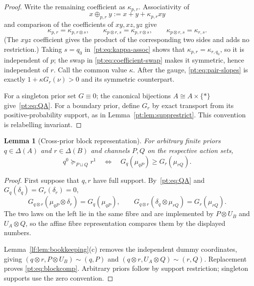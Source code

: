\documentclass[11pt,a4paper]{article}
\newtheorem{lemma}[theorem]{Lemma}
\theoremstyle{definition}
\newcommand{\1}{\mathbf 1}
\begin{document}
\begin{proof}
Write the remaining coefficient as $\kappa_{p,r}$.  Associativity of
\[
 x\oplus_{p,r}y:=x+y+\kappa_{p,r}xy
\]
and comparison of the coefficients of $xy,xz,yz$ give
\[
 \kappa_{p,r}=\kappa_{p,r\otimes s},\qquad
 \kappa_{p\otimes r,s}=\kappa_{p,r\otimes s},\qquad
 \kappa_{p\otimes r,s}=\kappa_{r,s}.
\tag{KA}\label{pt:eq:kappa-assoc}
\]
(The $xyz$ coefficient gives the product of the corresponding two sides and
adds no restriction.)  Taking $s=q_0$ in~\eqref{pt:eq:kappa-assoc} shows that
$\kappa_{p,r}=\kappa_{r,q_0}$, so it is independent of $p$; the swap in
\eqref{pt:eq:coefficient-swap} makes it symmetric, hence independent of $r$.
Call the common value $\kappa$.  After the gauge,
\eqref{pt:eq:pair-slopes} is exactly
$1+\kappa G_r(\nu)>0$ and its symmetric counterpart.

For a singleton prior set $G\equiv0$; the canonical bijections
$A\cong A\times\{*\}$ give~\eqref{pt:eq:QA}.  For a boundary prior, define
$G_r$ by exact transport from its positive-probability support, as in
Lemma~\ref{pt:lem:supprestrict}.  This convention is relabelling invariant.
\end{proof}

\begin{lemma}[Cross-prior block representation]
\label{pt:lem:blockbridge}
For arbitrary finite priors $q\in\Delta(A)$ and $r\in\Delta(B)$ and channels
$P,Q$ on the respective action sets,
\begin{equation}
 q^0\succeq_{P\sqcup Q}r^1
 \quad\Longleftrightarrow\quad
 G_q(\mu_{qP})\ge G_r(\mu_{rQ}).
\tag{BC}\label{pt:eq:blockcomp}
\end{equation}
\end{lemma}

\begin{proof}
First suppose that $q,r$ have full support.  By~\eqref{pt:eq:QA} and
$G_q(\delta_q)=G_r(\delta_r)=0$,
\[
 G_{q\otimes r}(\mu_{qP}\otimes\delta_r)=G_q(\mu_{qP}),
 \qquad
 G_{q\otimes r}(\delta_q\otimes\mu_{rQ})=G_r(\mu_{rQ}).
\]
The two laws on the left lie in the same fibre and are implemented by
$P\otimes U_B$ and $U_A\otimes Q$, so the affine fibre representation
compares them by the displayed numbers.

Lemma~\ref{lf:lem:bookkeeping}\textup{(c)} removes the independent dummy
coordinates, giving
$(q\otimes r,P\otimes U_B)\sim(q,P)$ and
$(q\otimes r,U_A\otimes Q)\sim(r,Q)$.  Replacement proves
\eqref{pt:eq:blockcomp}.  Arbitrary priors follow by support restriction;
singleton supports use the zero convention.
\end{proof}
\end{document}
